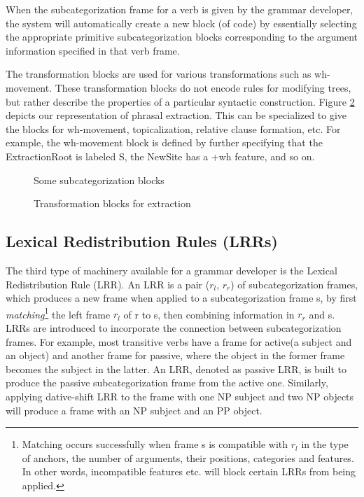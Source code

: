 When the subcategorization frame for a  verb is given
 by the grammar
developer, the system will automatically create a new block (of code) by
essentially selecting the appropriate primitive subcategorization blocks
corresponding to the argument information specified in that verb
frame. 

The transformation blocks are used for various transformations such as
wh-movement. These transformation blocks do not encode
rules for modifying trees, but rather describe
 the properties of a particular syntactic construction.
 Figure \ref{trans-blocks} depicts
our representation of phrasal extraction.
This can be specialized to give the
blocks for wh-movement, topicalization, relative clause formation, etc.  
For example, the
wh-movement block is defined by further specifying that the ExtractionRoot is
labeled S, the NewSite
has a +wh feature, and so on. 


\begin{figure}[htb]
\centerline{}
\caption{Some subcategorization blocks}
\label{subcat-blocks}
\end{figure}

\begin{figure}[htb]
\centerline{}
\caption{Transformation blocks for extraction}
\label{trans-blocks}
\end{figure}


\subsection{Lexical Redistribution Rules (LRRs)}
The third type of machinery available for a grammar developer is the
Lexical Redistribution Rule (LRR). An LRR is a pair 
($r_{l}$, $r_{r}$) of subcategorization frames, 
which produces a new frame when applied to a subcategorization frame s,
by first {\it matching}\footnote{Matching occurs successfully when frame s
is compatible with $r_{l}$ in the type of anchors, the number of arguments,
their positions, categories and features. In other words, incompatible
features etc. will block certain LRRs from being applied.}
 the
left frame $r_{l}$ of r to s, then 
combining information in $r_{r}$ and s.
LRRs are introduced to incorporate
the connection between subcategorization frames. For example,
most transitive verbs have a frame for active(a subject and an object)
and another frame for passive, where the object in the former frame becomes
the subject in the latter. An LRR, denoted as  passive LRR,
is built to produce the passive subcategorization frame from
the active one.
Similarly, applying dative-shift LRR to the frame with
one NP subject and two NP objects will produce 
a frame with an NP subject and an PP object.



